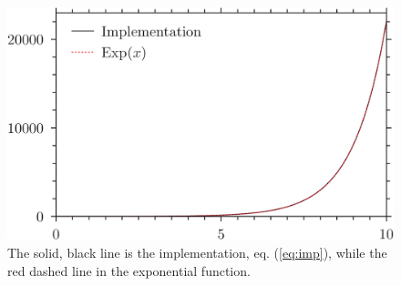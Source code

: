 \documentclass[twocolumn]{article}
\begin{document}
\begin{figure}
	\centering
	\label{fig:exp}
	\includegraphics[width=\linewidth]{exp.png}
	\caption{The solid, black line is the implementation, eq. (\ref{eq:imp}), while the red dashed line in the exponential function.}
\end{figure}
\end{document}
